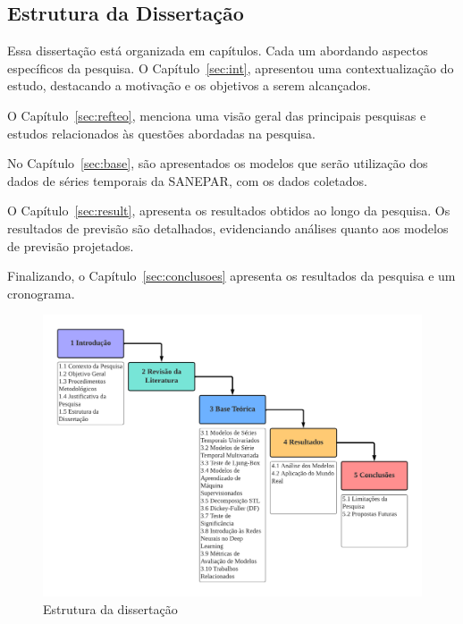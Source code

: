 \subsection{Estrutura da Disserta\c c\~ao} \label{subsec:estrutura}


Essa dissertação está organizada em capítulos. Cada um abordando aspectos específicos da pesquisa. 
O Capítulo~\ref{sec:int},  apresentou uma contextualização do estudo, destacando a motivação e os objetivos a serem alcançados. 

O Capítulo~\ref{sec:refteo}, menciona uma visão geral das principais pesquisas e estudos relacionados às questões abordadas na pesquisa.

No Capítulo~\ref{sec:base}, são apresentados os modelos que serão utilização dos dados de séries temporais da SANEPAR, com os dados coletados.


O Capítulo~\ref{sec:result}, apresenta os resultados obtidos ao longo da pesquisa.  Os resultados de previsão são detalhados, evidenciando análises quanto aos modelos de previsão projetados.

Finalizando, o Capítulo~\ref{sec:conclusoes} apresenta os resultados da pesquisa e um cronograma.


 
 \begin{figure}[H]
 	\centering
 	\caption{Estrutura da dissertação}
 	\label{fig:estrutura}
 	\includegraphics[width=0.9\linewidth]{Introducao/Figuras/estrutura}
 	
 	 
 \end{figure}



